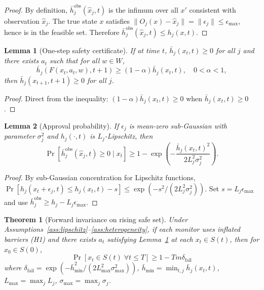 \documentclass[11pt,a4paper]{article}
\newtheorem{theorem}{Theorem}
\newtheorem{lemma}{Lemma}
\begin{document}
\begin{proof}
By definition, $\bar{h}_j^{\text{obs}}(\hat{x}_j,t)$ is the infimum over all $x'$ consistent with observation $\hat{x}_j$. The true state $x$ satisfies $\|O_j(x) - \hat{x}_j\| = \|\epsilon_j\| \leq \epsilon_{\max}$, hence is in the feasible set. Therefore $\bar{h}_j^{\text{obs}}(\hat{x}_j,t) \leq h_j(x,t)$.
\end{proof}

\begin{lemma}[One-step safety certificate]
\label{lem:certificate}
If at time $t$, $\bar{h}_j(x_t,t) \geq 0$ for all $j$ and there exists $a_t$ such that for all $w \in W$,
$$\bar{h}_j(F(x_t,a_t,w), t+1) \geq (1-\alpha) \bar{h}_j(x_t,t), \quad 0 < \alpha < 1,$$
then $\bar{h}_j(x_{t+1}, t+1) \geq 0$ for all $j$.
\end{lemma}

\begin{proof}
Direct from the inequality: $(1-\alpha) \bar{h}_j(x_t,t) \geq 0$ when $\bar{h}_j(x_t,t) \geq 0$.
\end{proof}

\begin{lemma}[Approval probability]
\label{lem:approval}
If $\epsilon_j$ is mean-zero sub-Gaussian with parameter $\sigma_j^2$ and $h_j(\cdot,t)$ is $L_j$-Lipschitz, then
$$\Pr[\bar{h}_j^{\text{obs}}(\hat{x}_j,t) \geq 0 \mid x_t] \geq 1 - \exp\left(-\frac{\bar{h}_j(x_t,t)^2}{2L_j^2 \sigma_j^2}\right).$$
\end{lemma}

\begin{proof}
By sub-Gaussian concentration for Lipschitz functions, $\Pr[h_j(x_t + \epsilon_j, t) \leq h_j(x_t,t) - s] \leq \exp(-s^2/(2L_j^2\sigma_j^2))$. Set $s = L_j \epsilon_{\max}$ and use $\bar{h}_j^{\text{obs}} \geq h_j - L_j\epsilon_{\max}$.
\end{proof}

\begin{theorem}[Forward invariance on rising safe set]
\label{thm:invariance}
Under Assumptions~\ref{ass:lipschitz}--\ref{ass:heterogeneity}, if each monitor uses inflated barriers (H1) and there exists $a_t$ satisfying Lemma~\ref{lem:certificate} at each $x_t \in S(t)$, then for $x_0 \in S(0)$,
$$\Pr[x_t \in S(t) \;\forall t \leq T] \geq 1 - Tm\delta_{\text{fail}}$$
where $\delta_{\text{fail}} = \exp(-\bar{h}_{\min}^2/(2L_{\max}^2\sigma_{\max}^2))$, $\bar{h}_{\min} = \min_{t,j} \bar{h}_j(x_t,t)$, $L_{\max} = \max_j L_j$, $\sigma_{\max} = \max_j \sigma_j$.
\end{theorem}
\end{document}
